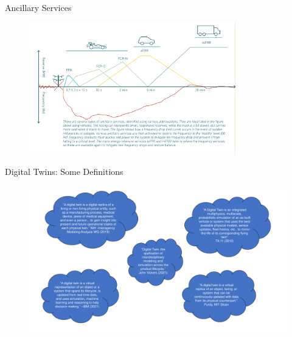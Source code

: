 \documentclass[aspectratio=169,hyperref={pdfpagelabels=false}]{beamer}
\begin{document}
\begin{frame}{\Large{Ancillary Services}}
\begin{figure}[h]
\includegraphics[width=0.80\textwidth]{img/ancillary_services.png} \centering
\let\thefootnote\relax{}
\end{figure}
\end{frame}

\begin{frame}{\Large{Digital Twins: Some Definitions}}
  \begin{figure}[h]
    \vspace{0em}
    \includegraphics[width=1\textwidth]{img/digital_twin_definitions.pdf} \centering
  \end{figure}
\end{frame}
\end{document}
